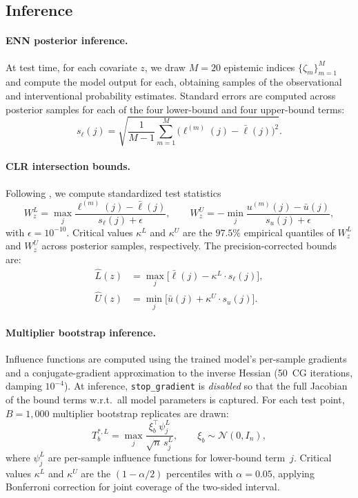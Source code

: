 \documentclass[accepted]{uai2026} %
\theoremstyle{plain}
\theoremstyle{definition}
\theoremstyle{remark}
\begin{document}
\subsection{Inference}
\label{app:inference}

\paragraph{ENN posterior inference.}
At test time, for each covariate $z$, we draw
$M = 20$ epistemic indices
$\{\zeta_m\}_{m=1}^{M}$ and compute the model
output for each, obtaining samples of the
observational and interventional probability
estimates.  Standard errors are computed across
posterior samples for each of the four
lower-bound and four upper-bound terms:
\[
  s_{\ell}(j)
  = \sqrt{
    \frac{1}{M-1}
    \sum_{m=1}^{M}
    \bigl(\ell^{(m)}(j) - \bar{\ell}(j)\bigr)^2
  }.
\]

\paragraph{CLR intersection bounds.}
Following
\citet{chernozhukov2013intersection}, we
compute standardized test statistics
\[
  W_z^L = \max_j
    \frac{\ell^{(m)}(j) - \bar{\ell}(j)}
         {s_\ell(j) + \epsilon},
  \qquad
  W_z^U = -\min_j
    \frac{u^{(m)}(j) - \bar{u}(j)}
         {s_u(j) + \epsilon},
\]
with $\epsilon = 10^{-10}$.  Critical values
$\kappa^L$ and $\kappa^U$ are the $97.5\%$
empirical quantiles of $W_z^L$ and $W_z^U$
across posterior samples, respectively.  The
precision-corrected bounds are:
\begin{align}
  \hat{L}(z)
    &= \max_j
      \bigl[\bar{\ell}(j) - \kappa^L
        \cdot s_\ell(j)\bigr],
    \\
  \hat{U}(z)
    &= \min_j
      \bigl[\bar{u}(j) + \kappa^U
        \cdot s_u(j)\bigr].
\end{align}

\paragraph{Multiplier bootstrap inference.}
Influence functions are computed using the
trained model's per-sample gradients and a
conjugate-gradient approximation to the inverse
Hessian (50~CG iterations, damping $10^{-4}$).
At inference, \texttt{stop\_gradient} is
\emph{disabled} so that the full Jacobian of
the bound terms w.r.t.\ all model parameters
is captured.  For each test point,
$B = 1{,}000$ multiplier bootstrap replicates
are drawn:
\[
  T_b^{*,L} = \max_j
    \frac{\xi_b^\top \psi_j^L}
         {\sqrt{n}\,s_j^L},
  \qquad
  \xi_b \sim \mathcal{N}(0, I_n),
\]
where $\psi_j^L$ are per-sample influence
functions for lower-bound term~$j$.  Critical
values $\kappa^L$ and $\kappa^U$ are the
$(1 - \alpha/2)$ percentiles with
$\alpha = 0.05$, applying Bonferroni correction
for joint coverage of the two-sided interval.
\end{document}
